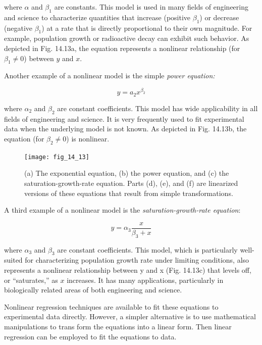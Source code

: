 \documentclass[../main.tex]{subfiles}
\begin{document}
\noindent where $\alpha$ and $\beta_1$ are constants. This model is used in many fields of engineering and science to characterize quantities that increase (positive $\beta_1$) or decrease (negative $\beta_1$) at a rate that is directly proportional to their own magnitude. For example, population growth or radioactive decay can exhibit such behavior. As depicted in Fig. 14.13a, the equation represents a nonlinear relationship (for $\beta_1 \neq 0$) between $y$ and $x$.

Another example of a nonlinear model is the simple \textit{power equation:}

\begin{equation}
	\tag{14.23}
	y = a_2 x^{\beta_2}
\end{equation}

\noindent where $\alpha_2$ and $\beta_2$ are constant coefficients. This model has wide applicability in all fields of engineering and science. It is very frequently used to fit experimental data when the underlying model is not known. As depicted in Fig. 14.13b, the equation (for $\beta_2 \neq 0$) is nonlinear.

\begin{figure}[H]
	\centering
	\texttt{[image: fig\_14\_13]}
	\caption{\textsf{(a) The exponential equation, (b) the power equation, and (c) the saturation-growth-rate equation. Parts (d), (e), and (f) are linearized versions of these equations that result from simple transformations.}}
	\label{fig:fig_14_13}
	\label{fig:fig_14_13a}
	\label{fig:fig_14_13b}
	\label{fig:fig_14_13c}
	\label{fig:fig_14_13d}
	\label{fig:fig_14_13e}
	\label{fig:fig_14_13f}
\end{figure}


A third example of a nonlinear model is the \textit{saturation-growth-rate equation}:

\begin{equation}
	\tag{14.24}
	y = \alpha_3 \frac{x}{\beta_3 + x}
\end{equation}

\noindent where $\alpha_3$ and $\beta_3$ are constant coefficients. This model, which is particularly well-suited for characterizing population growth rate under limiting conditions, also represents a nonlinear relationship between y and x (Fig. 14.13c) that levels off, or “saturates,” as $x$ increases. It has many applications, particularly in biologically related areas of both engineering and science.

Nonlinear regression techniques are available to fit these equations to experimental data directly. However, a simpler alternative is to use mathematical manipulations to trans form the equations into a linear form. Then linear regression can be employed to fit the equations to data.
\end{document}
